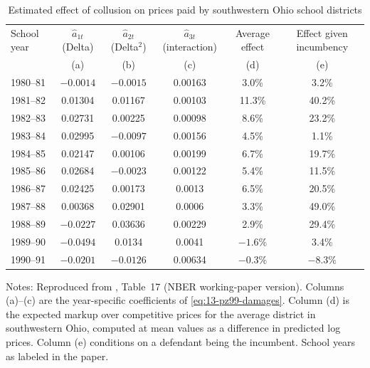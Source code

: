 \begin{table}[htbp]
\centering
\caption{Estimated effect of collusion on prices paid by southwestern Ohio school districts}\label{tab:13-pz99-t17}
\small
\begin{tabular}{@{}lccccc@{}}
\toprule
School year & $\hat a_{1t}$ (Delta) & $\hat a_{2t}$ (Delta$^2$) & $\hat a_{3t}$ (interaction) & Average effect & Effect given incumbency\\
 & (a) & (b) & (c) & (d) & (e)\\
\midrule
1980--81 & $-0.0014$ & $-0.0015$ & 0.00163 & 3.0\% & 3.2\%\\
1981--82 & 0.01304 & 0.01167 & 0.00103 & 11.3\% & 40.2\%\\
1982--83 & 0.02731 & 0.00225 & 0.00098 & 8.6\% & 23.2\%\\
1983--84 & 0.02995 & $-0.0097$ & 0.00156 & 4.5\% & 1.1\%\\
1984--85 & 0.02147 & 0.00106 & 0.00199 & 6.7\% & 19.7\%\\
1985--86 & 0.02684 & $-0.0023$ & 0.00122 & 5.4\% & 11.5\%\\
1986--87 & 0.02425 & 0.00173 & 0.0013 & 6.5\% & 20.5\%\\
1987--88 & 0.00368 & 0.02901 & 0.0006 & 3.3\% & 49.0\%\\
1988--89 & $-0.0227$ & 0.03636 & 0.00229 & 2.9\% & 29.4\%\\
1989--90 & $-0.0494$ & 0.0134 & 0.0041 & $-1.6\%$ & 3.4\%\\
1990--91 & $-0.0201$ & $-0.0126$ & 0.00634 & $-0.3\%$ & $-8.3\%$\\
\bottomrule
\end{tabular}

\smallskip
\begin{minipage}{0.92\textwidth}\footnotesize
Notes: Reproduced from \citet{PorterZona1999}, Table~17 (NBER working-paper version). Columns (a)--(c)
are the year-specific coefficients of \eqref{eq:13-pz99-damages}. Column (d) is the expected markup over
competitive prices for the average district in southwestern Ohio, computed at mean values as a difference in
predicted log prices. Column (e) conditions on
a defendant being the incumbent. School years as labeled in the paper.
\end{minipage}
\end{table}

